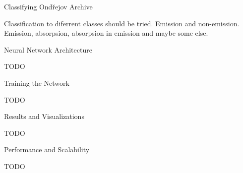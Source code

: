 \chap Classifying Ondřejov Archive

Classification to diferrent classes should be tried.
Emission and non-emission.
Emission, absorpsion, absorpsion in emission and maybe some else.

\sec Neural Network Architecture

TODO

\sec Training the Network

TODO

\sec Results and Visualizations

TODO

\sec Performance and Scalability

TODO
